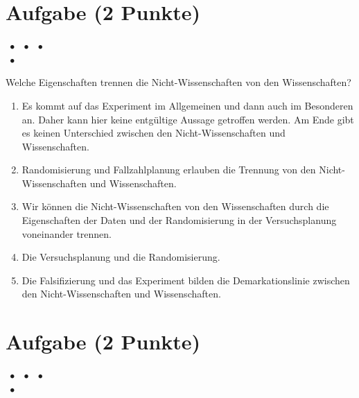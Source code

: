 \documentclass[a4paper, 9pt]{scrartcl}\usepackage[]{graphicx}\usepackage[]{xcolor}
\begin{document}
\section{Aufgabe \hfill (2 Punkte)}

\ifcollection
\begin{flushright}
\tiny\vspace{-2Ex}
\textbf{\examinhaltstart}
\exammodulemathstat $\;\bullet$
\exammodulestat $\;\bullet$
\exammodulestatbbv $\;\bullet$
\exammodulestatversuch\\
\exammodulelanddaten $\;\bullet$
\exammodulebiostat
\vspace{-1Ex}
\end{flushright}
\fi




Welche Eigenschaften trennen die Nicht-Wissenschaften von den Wissenschaften?



\begin{enumerate}
\item [\textbf{A} \msquare] Es kommt auf das Experiment im Allgemeinen und dann auch im Besonderen an. Daher kann hier keine entgültige Aussage getroffen werden. Am Ende gibt es keinen Unterschied zwischen den Nicht-Wissenschaften und Wissenschaften.
\item [\textbf{B} \msquare] Randomisierung und Fallzahlplanung erlauben die Trennung von den Nicht-Wissenschaften und Wissenschaften.
\item [\textbf{C} \msquare] Wir können die Nicht-Wissenschaften von den Wissenschaften durch die Eigenschaften der Daten und der Randomisierung in der Versuchsplanung voneinander trennen.
\item [\textbf{D} \msquare] Die Versuchsplanung und die Randomisierung.
\item [\textbf{E} \msquare] Die Falsifizierung und das Experiment bilden die Demarkationslinie zwischen den Nicht-Wissenschaften und Wissenschaften.
\end{enumerate} 

\section{Aufgabe \hfill (2 Punkte)}

\ifcollection
\begin{flushright}
\tiny\vspace{-2Ex}
\textbf{\examinhaltstart}
\exammodulemathstat $\;\bullet$
\exammodulestat $\;\bullet$
\exammodulestatbbv $\;\bullet$
\exammodulestatversuch\\
\exammodulelanddaten $\;\bullet$
\exammodulebiostat
\vspace{-1Ex}
\end{flushright}
\fi
\end{document}
